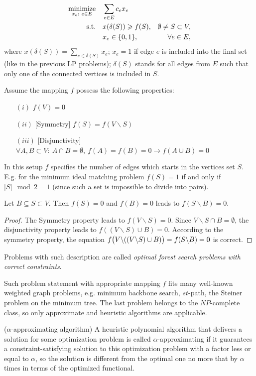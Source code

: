 \documentclass[11pt, tightenlines, twoside, onecolumn, nofloats, nobibnotes, nofootinbib, superscriptaddress, noshowpacks, centertags]{revtex4}
\begin{document}
\begin{align}
\underset{x_e:~e\in E}{\text{minimize}}\quad & \sum\limits_{e\in E}c_ex_e \nonumber\\
\text{s.t.\quad} & x(\delta(S))\geqslant f(S), & \emptyset\not=S\subset V,
\label{ilp_cfp}\\
& x_e\in\{0,1\}, &\forall e\in E,\nonumber
\end{align}
where $x(\delta(S))=\sum\limits_{e\in \delta(S)}x_e$; $x_e=1$ if edge $e$ is included into the final set (like in the previous LP problems); $\delta(S)$ stands for all edges from $E$ such that only one of the connected vertices is included in $S$.

Assume the mapping $f$ possess the following properties:
\begin{itemize}
    \item[$(i)$] $f(V) = 0$
    \item[$(ii)$][Symmetry] $f(S)=f(V\backslash S)$
    \item[$(iii)$][Disjunctivity] $\forall A,B\subset V:~A\cap B = \emptyset,~f(A)=f(B)=0\to f(A\cup B) = 0$
\end{itemize}
In this setup $f$ specifies the number of edges which starts in the vertices set $S$. E.g. for the minimum ideal matching problem $f (S) = 1$ if and only if $|S|\mod 2 = 1$ (since such a set is impossible to divide into pairs).

\begin{lemma}
    Let $B\subseteq S\subset V$. Then $f(S) = 0$ and $f(B) = 0$ leads to $f(S\backslash B) = 0$.
    \label{lem1}
\end{lemma}
\begin{proof}
    The Symmetry property leads to $f (V\backslash S) = 0$. Since $V\backslash S \cap B = \emptyset$, the disjunctivity property leads to $f ((V\backslash S)\cup B) = 0$. According to the symmetry property, the equation $f\big( V\backslash ((V\backslash S)\cup B)\big) = f(S\backslash B) = 0$ is correct.
\end{proof}

Problems with such description are called \emph{optimal forest search problems with correct constraints}.

Such problem statement with appropriate mapping $f$ fits many well-known weighted graph problems, e.g. minimum backbone search, $st$-path, the Steiner problem on the minimum tree. The last problem belongs to the $NP$-complete class, so only approximate and heuristic algorithms are applicable.

\begin{definition} {($\alpha$-approximating algorithm)}
A heuristic polynomial algorithm that delivers a solution for some optimization problem is called $\alpha$-approximating if it guarantees a constraint-satisfying solution to this optimization problem with a factor less or equal to $\alpha$, so the solution is different from the optimal one no more that by $\alpha$ times in terms of the optimized functional.
\end{definition}
\end{document}
